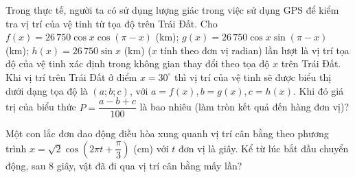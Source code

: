\begin{ex}%
	Trong thực tế, người ta có sử dụng lượng giác trong việc sử dụng GPS để kiểm tra vị trí của vệ tinh từ tọa độ trên Trái Đất. Cho $ f(x) = 26\,750 \cos x\cos(\pi-x)$ (km); $g(x)=26\,750\cos x\sin(\pi-x)$ (km); $h(x)=26\,750\sin x$ (km) ($x$ tính theo đơn vị radian) lần lượt là vị trí tọa độ của vệ tinh xác định trong không gian thay đổi theo tọa độ $x$ trên Trái Đất. Khi vị trí trên Trái Đất ở điểm $x=30^\circ$ thì vị trí của vệ tinh sẽ được biểu thị dưới dạng tọa độ là $(a;b;c)$, với $a=f(x),b=g(x),c=h(x)$. Khi đó giá trị của biểu thức $P=\dfrac{a-b+c}{100}$ là bao nhiêu (làm tròn kết quả đến hàng đơn vị)?
\end{ex}

\begin{ex}%
	Một con lắc đơn dao động điều hòa xung quanh vị trí cân bằng theo phương trình $x=\sqrt{2}\cos\left(2\pi t+\dfrac{\pi}{3}\right)$ (cm) với $t$ đơn vị là giây. Kể từ lúc bắt đầu chuyển động, sau $8$ giây, vật đã đi qua vị trí cân bằng mấy lần?
\end{ex}


